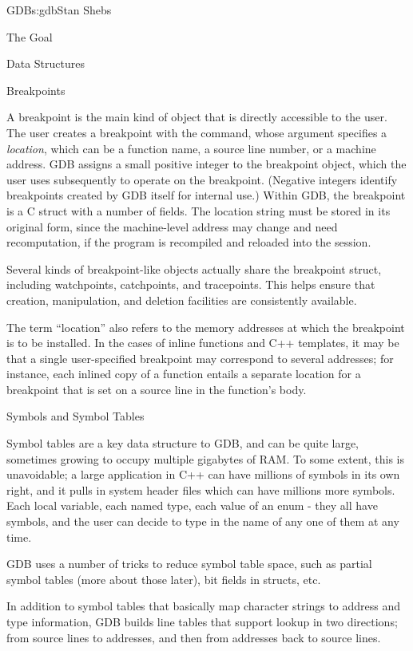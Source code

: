 \begin{aosachapter}{GDB}{s:gdb}{Stan Shebs}
\begin{aosasect1}{The Goal}
\begin{aosasect1}{Data Structures}
\end{aosasect1}

\begin{aosasect2}{Breakpoints}

A breakpoint is the main kind of object that is directly accessible to
the user.  The user creates a breakpoint with the  command,
whose argument specifies a {\em location}, which can be a function
name, a source line number, or a machine address.  GDB assigns a small
positive integer to the breakpoint object, which the user uses
subsequently to operate on the breakpoint.  (Negative integers
identify breakpoints created by GDB itself for internal use.)  Within
GDB, the breakpoint is a C struct with a number of fields.  The
location string must be stored in its original form, since the
machine-level address may change and need recomputation, if the
program is recompiled and reloaded into the session.

Several kinds of breakpoint-like objects actually share the breakpoint
struct, including watchpoints, catchpoints, and tracepoints.  This
helps ensure that creation, manipulation, and deletion facilities are
consistently available.

The term ``location'' also refers to the memory addresses at which the
breakpoint is to be installed.  In the cases of inline functions and
C++ templates, it may be that a single user-specified breakpoint may
correspond to several addresses; for instance, each inlined copy of a
function entails a separate location for a breakpoint that is set on a
source line in the function's body.

\end{aosasect2}

\begin{aosasect2}{Symbols and Symbol Tables}

Symbol tables are a key data structure to GDB, and can be quite large,
sometimes growing to occupy multiple gigabytes of RAM.  To some
extent, this is unavoidable; a large application in C++ can have
millions of symbols in its own right, and it pulls in system header
files which can have millions more symbols.  Each local variable, each
named type, each value of an enum - they all have symbols, and the
user can decide to type in the name of any one of them at any time.

GDB uses a number of tricks to reduce symbol table space, such as
partial symbol tables (more about those later), bit fields in structs,
etc.

In addition to symbol tables that basically map character strings to
address and type information, GDB builds line tables that support
lookup in two directions; from source lines to addresses, and then
from addresses back to source lines.


\end{aosasect2}
\end{aosasect1}
\end{aosachapter}
